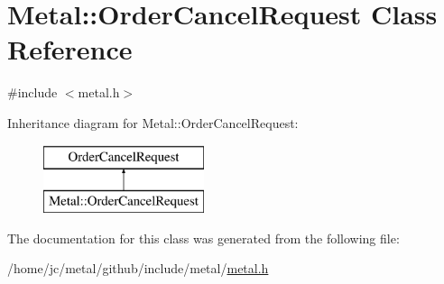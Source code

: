 \hypertarget{classMetal_1_1OrderCancelRequest}{}\section{Metal\+:\+:Order\+Cancel\+Request Class Reference}
\label{classMetal_1_1OrderCancelRequest}


{\ttfamily \#include $<$metal.\+h$>$}

Inheritance diagram for Metal\+:\+:Order\+Cancel\+Request\+:\begin{figure}[H]
\begin{center}
\leavevmode
\includegraphics[height=2.000000cm]{classMetal_1_1OrderCancelRequest}
\end{center}
\end{figure}


The documentation for this class was generated from the following file\+:\begin{DoxyCompactItemize}
\item 
/home/jc/metal/github/include/metal/\hyperlink{metal_8h}{metal.\+h}\end{DoxyCompactItemize}
